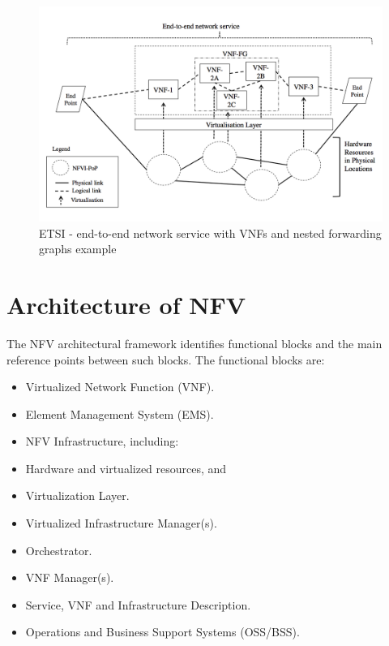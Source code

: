 \begin{figure}[h]
	\centering
	\includegraphics[clip= true, width= \columnwidth]{images/network_service.png}
	\caption{ETSI - end-to-end network service with VNFs and nested forwarding graphs example}
	\label{fig:end2end_network_service}
\end{figure}

\section{Architecture of NFV}
The NFV architectural framework identifies functional blocks and the main reference points between such blocks. The functional blocks are:
\begin{itemize}
	\item Virtualized Network Function (VNF).
	\item Element Management System (EMS).
	\item NFV Infrastructure, including:
	\item Hardware and virtualized resources, and
	\item Virtualization Layer.
	\item Virtualized Infrastructure Manager(s).
	\item Orchestrator.
	\item VNF Manager(s).
	\item Service, VNF and Infrastructure Description.
	\item Operations and Business Support Systems (OSS/BSS).
\end{itemize}

